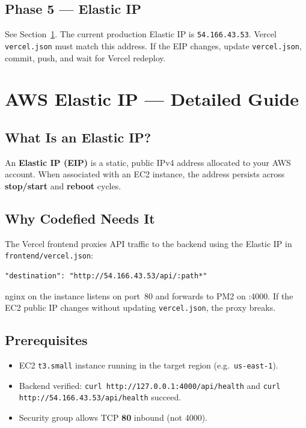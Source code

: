 \documentclass[11pt,a4paper]{article}
\newcommand{\productionip}{\texttt{54.166.43.53}}
\begin{document}
\subsection{Phase 5 --- Elastic IP}
See Section~\ref{sec:elastic-ip}. The current production Elastic IP is \productionip. Vercel \texttt{vercel.json} must match this address. If the EIP changes, update \texttt{vercel.json}, commit, push, and wait for Vercel redeploy.

\section{AWS Elastic IP --- Detailed Guide}
\label{sec:elastic-ip}

\subsection{What Is an Elastic IP?}
An \textbf{Elastic IP (EIP)} is a static, public IPv4 address allocated to your AWS account. When associated with an EC2 instance, the address persists across \textbf{stop/start} and \textbf{reboot} cycles.

\subsection{Why Codefied Needs It}
The Vercel frontend proxies API traffic to the backend using the Elastic IP in \texttt{frontend/vercel.json}:
\begin{lstlisting}[style=envfile]
"destination": "http://54.166.43.53/api/:path*"
\end{lstlisting}
nginx on the instance listens on port~80 and forwards to PM2 on :4000. If the EC2 public IP changes without updating \texttt{vercel.json}, the proxy breaks.

\subsection{Prerequisites}
\begin{itemize}[noitemsep]
  \item EC2 \texttt{t3.small} instance running in the target region (e.g.\ \texttt{us-east-1}).
  \item Backend verified: \texttt{curl http://127.0.0.1:4000/api/health} and \texttt{curl http://54.166.43.53/api/health} succeed.
  \item Security group allows TCP \textbf{80} inbound (not 4000).
\end{itemize}
\end{document}
